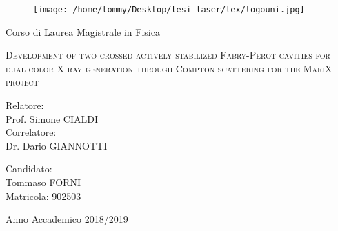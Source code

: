 \documentclass[12pt,a4paper,twoside,
openright]{book}
\begin{document}
\begin{titlepage}
	
	\begin{figure}
		\centering
		\texttt{[image: /home/tommy/Desktop/tesi\_laser/tex/logouni.jpg]}%
		\vspace{0.5 cm}
	\end{figure}
	

\begin{center}
{\LARGE Corso di Laurea Magistrale in Fisica}
\end{center}

\begin{center}
\vspace{3 cm}
{\Large \textsc{Development of two crossed actively stabilized Fabry-Perot cavities for dual color X-ray generation through Compton scattering for the MariX project} }
\end{center}
\par
  \vspace{3 cm}
  
  \begin{flushleft}
  		 Relatore:\\ Prof. Simone CIALDI\\
		 
  		 \noindent Correlatore:\\ Dr. Dario GIANNOTTI
  \end{flushleft}
  \vspace{1 cm}
  \begin{flushright}
  	Candidato:\\ Tommaso FORNI\\ Matricola: 902503
  \end{flushright}
    	  
\vfill
\begin{center}
	{\large Anno Accademico 2018/2019}
\end{center}
\end{titlepage}
\end{document}
